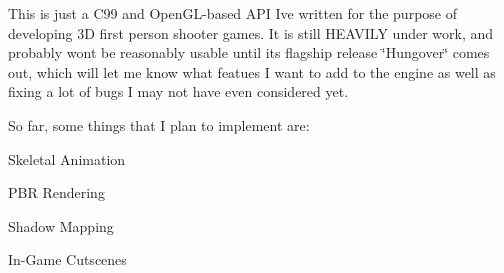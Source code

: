 This is just a C99 and Open\+GL-\/based API I\textquotesingle{}ve written for the purpose of developing 3D first person shooter games. It is still HEAVILY under work, and probably won\textquotesingle{}t be reasonably usable until it\textquotesingle{}s flagship release \char`\"{}\+Hungover\char`\"{} comes out, which will let me know what featues I want to add to the engine as well as fixing a lot of bugs I may not have even considered yet.

So far, some things that I plan to implement are\+:
\begin{DoxyItemize}
\item Skeletal Animation
\item PBR Rendering
\item Shadow Mapping
\item In-\/\+Game Cutscenes 
\end{DoxyItemize}